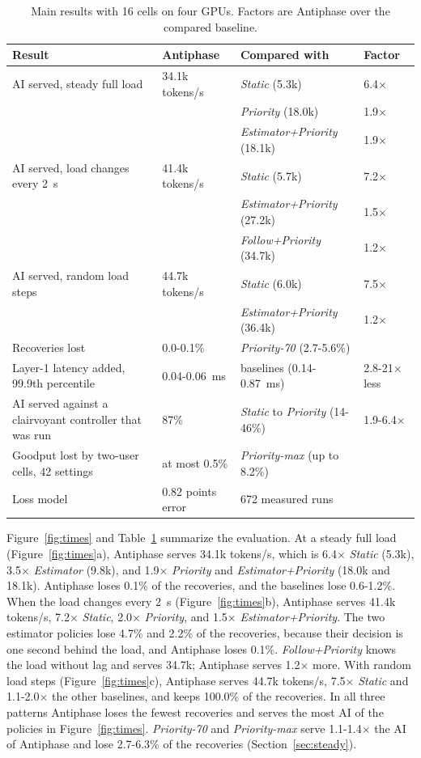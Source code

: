 \documentclass[acmsmall,screen,review,anonymous]{acmart}
\newcommand{\sys}{Antiphase\xspace}
\begin{document}
\begin{table}[t]
\caption{Main results with 16 cells on four GPUs. Factors are \sys over the compared baseline.}
\label{tab:summary}
\footnotesize
\setlength{\tabcolsep}{4pt}
\begin{tabular}{@{}llll@{}}
\toprule
Result & \sys & Compared with & Factor \\
\midrule
AI served, steady full load & 34.1k tokens/s & \textit{Static} (5.3k) & 6.4$\times$ \\
 & & \textit{Priority} (18.0k) & 1.9$\times$ \\
 & & \textit{Estimator+Priority} (18.1k) & 1.9$\times$ \\
AI served, load changes every 2~s & 41.4k tokens/s & \textit{Static} (5.7k) & 7.2$\times$ \\
 & & \textit{Estimator+Priority} (27.2k) & 1.5$\times$ \\
 & & \textit{Follow+Priority} (34.7k) & 1.2$\times$ \\
AI served, random load steps & 44.7k tokens/s & \textit{Static} (6.0k) & 7.5$\times$ \\
 & & \textit{Estimator+Priority} (36.4k) & 1.2$\times$ \\
Recoveries lost & 0.0-0.1\% & \textit{Priority-70} (2.7-5.6\%) & \\
Layer-1 latency added, 99.9th percentile & 0.04-0.06~ms & baselines (0.14-0.87~ms) & 2.8-21$\times$ less \\
AI served against a clairvoyant controller that was run & 87\% & \textit{Static} to \textit{Priority} (14-46\%) & 1.9-6.4$\times$ \\
Goodput lost by two-user cells, 42 settings & at most 0.5\% & \textit{Priority-max} (up to 8.2\%) & \\
Loss model & 0.82 points error & 672 measured runs & \\
\bottomrule
\end{tabular}
\end{table}

Figure~\ref{fig:times} and Table~\ref{tab:summary} summarize the evaluation. At a steady full load
(Figure~\ref{fig:times}a), \sys serves 34.1k tokens/s, which is 6.4$\times$ \textit{Static} (5.3k),
3.5$\times$ \textit{Estimator} (9.8k), and 1.9$\times$ \textit{Priority} and \textit{Estimator+Priority}
(18.0k and 18.1k). \sys loses 0.1\% of the recoveries, and the baselines lose 0.6-1.2\%. When the load
changes every 2~s (Figure~\ref{fig:times}b), \sys serves 41.4k tokens/s, 7.2$\times$ \textit{Static},
2.0$\times$ \textit{Priority}, and 1.5$\times$ \textit{Estimator+Priority}. The two estimator policies
lose 4.7\% and 2.2\% of the recoveries, because their decision is one second behind the load, and \sys
loses 0.1\%. \textit{Follow+Priority} knows the load without lag and serves 34.7k; \sys serves
1.2$\times$ more. With random load steps (Figure~\ref{fig:times}c), \sys serves 44.7k tokens/s,
7.5$\times$ \textit{Static} and 1.1-2.0$\times$ the other baselines, and keeps 100.0\% of the recoveries. In
all three patterns \sys loses the fewest recoveries and serves the most AI of the policies in
Figure~\ref{fig:times}. \textit{Priority-70} and
\textit{Priority-max} serve 1.1-1.4$\times$ the AI of \sys and lose 2.7-6.3\% of the recoveries
(Section~\ref{sec:steady}).
\end{document}
